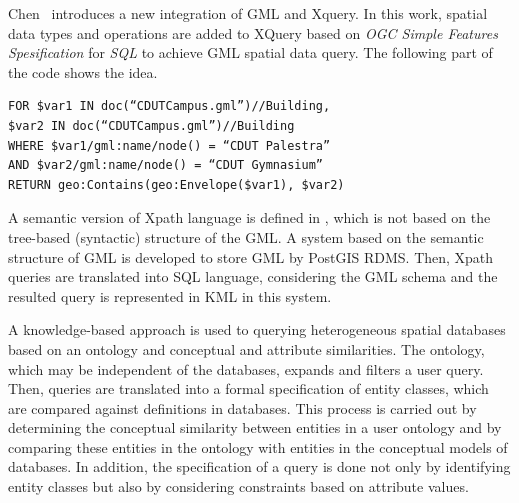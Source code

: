 \documentclass[a4paper,12pt]{article}
\begin{document}
Chen~\cite{Chen2010} introduces a new integration of GML and Xquery. In this work,
spatial data types and operations are added to XQuery based on \emph{OGC Simple
Features Spesification} for \emph{SQL} to achieve GML spatial data query.
The following part of the code shows the idea. 

\begin{verbatim}
FOR $var1 IN doc(“CDUTCampus.gml”)//Building,
$var2 IN doc(“CDUTCampus.gml”)//Building
WHERE $var1/gml:name/node() = “CDUT Palestra”
AND $var2/gml:name/node() = “CDUT Gymnasium”
RETURN geo:Contains(geo:Envelope($var1), $var2)
\end{verbatim}

A semantic version of Xpath language is defined in \cite{Alemdros2011, Alemdros2013}, 
which is not based on the tree-based (syntactic) structure of the GML.
A system based on the semantic structure of GML is developed to store GML by PostGIS RDMS.
Then, Xpath queries are translated into SQL language, considering the GML schema
and the resulted query is represented in KML \cite{kml} in this system.

\cite{Gutierrez2004} A knowledge-based approach is used to querying heterogeneous spatial databases based on an ontology and conceptual and attribute similarities. The ontology, which may be independent of the databases, expands and filters a user query. Then, queries are translated into a formal specification of entity classes, which are compared against definitions in databases. This process is carried out by determining the conceptual similarity between entities in a user ontology and by comparing these entities in the ontology with entities in the conceptual models of databases. In addition, the speciﬁcation of a query is done not only by identifying entity classes but also by considering constraints based on attribute values.
\end{document}
